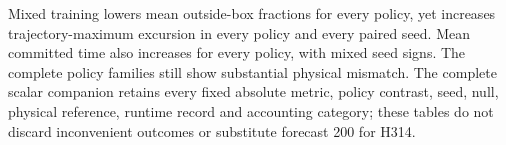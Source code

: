 Mixed training lowers mean outside-box fractions for every policy, yet increases trajectory-maximum excursion in every policy and every paired seed. Mean committed time also increases for every policy, with mixed seed signs. The complete policy families still show substantial physical mismatch. The complete scalar companion retains every fixed absolute metric, policy contrast, seed, null, physical reference, runtime record and accounting category; these tables do not discard inconvenient outcomes or substitute forecast 200 for H314.


